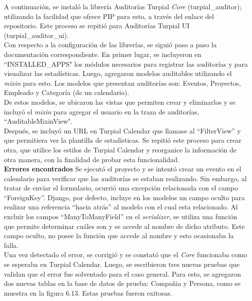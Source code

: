 A continuación, se instaló la librería Auditorías Turpial \textit{Core} (turpial\_auditor); utilizando la facilidad que ofrece PIP para esto, a través del enlace del repositorio. Este proceso se repitió para Auditorías Turpial UI (turpial\_auditor\_ui).\\

Con respecto a la configuración de las librerías, se siguió paso a paso la documentación correspondiente. En primer lugar, se incluyeron en “INSTALLED\_APPS" los módulos necesarios para registrar las auditorías y para visualizar las estadísticas. Luego, agregaron modelos auditables utilizando el \textit{mixin} para esto. Los modelos que presentan auditorías son: Eventos, Proyectos, Empleado y Categoría (de un calendario).\\

De estos modelos, se ubicaron las vistas que permiten crear y eliminarlos y se incluyó el \textit{mixin} para agregar el usuario en la traza de auditorías, “AuditableMixinView".\\

Después, se incluyó un URL en Turpial Calendar que llamase al “FilterView” y que permitiera ver la plantilla de estadísticas. Se repitió este proceso para crear otra, que utilice los estilos de Turpial Calendar y reorganice la información de otra manera, con la finalidad de probar esta funcionalidad.\\

\textbf{Errores encontrados}  Se ejecutó el proyecto y se intentó crear un evento en el calendario para verificar que las auditorías se estaban realizando. Sin embargo, al tratar de enviar el formulario, ocurrió una excepción relacionada con el campo “ForeignKey”. Django, por defecto, incluye en los modelos un campo oculto para realizar una referencia “hacia atrás” al modelo con el cual esta relacionado. Al excluir los campos “ManyToManyField” en el \textit{serializer}, se utiliza una función que permite determinar cuáles son y se accede al nombre de dicho atributo. Este campo oculto, no posee la función que accede al nombre y esto ocasionaba la falla.\\

Una vez detectado el error, se corrigió y se constató que el \textit{Core} funcionaba como se esperaba en Turpial Calendar. Luego, se escribieron tres nuevas pruebas que validan que el error fue solventado para el caso general. Para esto, se agregaron dos nuevas tablas en la base de datos de prueba: Compañia y Persona, como se muestra en la figura 6.13. Estas pruebas fueron exitosas.\\

